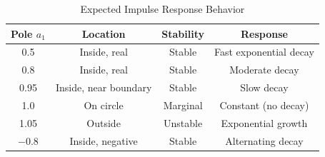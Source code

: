 \begin{table}[H]
\centering
\caption{Expected Impulse Response Behavior}
\begin{tabular}{cccc}
\toprule
\textbf{Pole} $a_1$ & \textbf{Location} & \textbf{Stability} & \textbf{Response} \\
\midrule
0.5 & Inside, real & Stable & Fast exponential decay \\
0.8 & Inside, real & Stable & Moderate decay \\
0.95 & Inside, near boundary & Stable & Slow decay \\
1.0 & On circle & Marginal & Constant (no decay) \\
1.05 & Outside & Unstable & Exponential growth \\
$-0.8$ & Inside, negative & Stable & Alternating decay \\
\bottomrule
\end{tabular}
\end{table}

